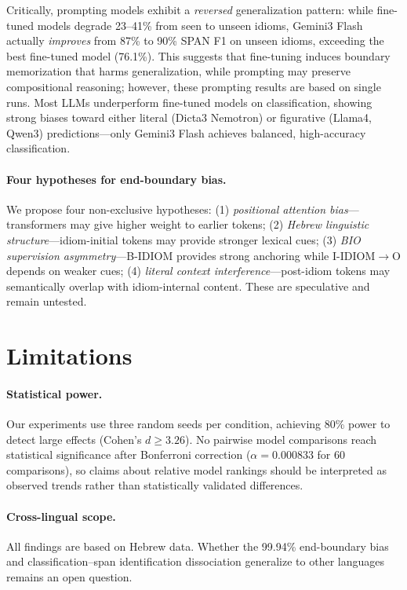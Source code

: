 \documentclass[11pt]{article}
\begin{document}
Critically, prompting models exhibit a \textit{reversed} generalization pattern: while fine-tuned models degrade 23--41\% from seen to unseen idioms, Gemini3 Flash actually \textit{improves} from 87\% to 90\% SPAN F1 on unseen idioms, exceeding the best fine-tuned model (76.1\%). This suggests that fine-tuning induces boundary memorization that harms generalization, while prompting may preserve compositional reasoning; however, these prompting results are based on single runs. Most LLMs underperform fine-tuned models on classification, showing strong biases toward either literal (Dicta3 Nemotron) or figurative (Llama4, Qwen3) predictions---only Gemini3 Flash achieves balanced, high-accuracy classification.

\paragraph{Four hypotheses for end-boundary bias.}
We propose four non-exclusive hypotheses: (1) \textit{positional attention bias}---transformers may give higher weight to earlier tokens; (2) \textit{Hebrew linguistic structure}---idiom-initial tokens may provide stronger lexical cues; (3) \textit{BIO supervision asymmetry}---B-IDIOM provides strong anchoring while I-IDIOM$\rightarrow$O depends on weaker cues; (4) \textit{literal context interference}---post-idiom tokens may semantically overlap with idiom-internal content. These are speculative and remain untested.

\section*{Limitations}

\paragraph{Statistical power.}
Our experiments use three random seeds per condition, achieving 80\% power to detect large effects (Cohen's $d \geq 3.26$). No pairwise model comparisons reach statistical significance after Bonferroni correction ($\alpha = 0.000833$ for 60 comparisons), so claims about relative model rankings should be interpreted as observed trends rather than statistically validated differences.

\paragraph{Cross-lingual scope.}
All findings are based on Hebrew data. Whether the 99.94\% end-boundary bias and classification--span identification dissociation generalize to other languages remains an open question.
\end{document}
